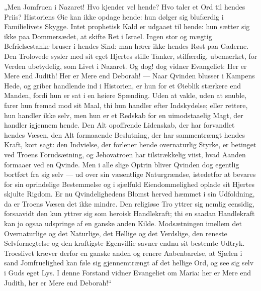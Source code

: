\documentclass[12pt,a4paper]{book}
\begin{document}
„Men Jomfruen i Nazaret! Hvo kjender vel hende? Hvo taler et Ord til hendes
Priis? Historiens Øie kan ikke opdage hende: hun dølger sig blufærdig i
Familielivets Skygge. Intet prophetisk Kald er udgaaet til hende: hun sætter sig
ikke paa Dommersædet, at skifte Ret i Israel. Ingen stor og mægtig
Befrielsestanke bruser i hendes Sind: man hører ikke hendes Røst paa Gaderne.
Den Trolovede sysler med sit eget Hjertes stille Tanker, stilfærdig, ubemærket,
for Verden ubetydelig, som Livet i Nazaret. Og dog! dog vidner Evangeliet: Her
er Mere end Judith! Her er Mere end Deborah! --- Naar Qvinden blusser i Kampens
Hede, og griber handlende ind i Historien, er hun for et Øieblik stærkere end
Manden, fordi hun er sat i en høiere Spænding. Uden at vakle, uden at snuble,
farer hun fremad mod sit Maal, thi hun handler efter Indskydelse; eller rettere,
hun handler ikke selv, men hun er et Redskab for en uimodstaaelig Magt, der
handler igjennem hende. Den Alt opoffrende Lidenskab, der har forvandlet hendes
Væsen, den Alt formaaende Beslutning, der har sammentrængt hendes Kraft, kort
sagt: den Indvielse, der forlener hende overnaturlig Styrke, er betinget ved
Troens Forudsætning, og Jehovatroen har tilstrækkelig viist, hvad Aanden formaaer
ved en Qvinde. Men i alle slige Optrin bliver Qvinden dog egentlig bortført fra
sig selv --- ud over sin væsentlige Naturgrændse, istedetfor at bevares for sin
oprindelige Bestemmelse og i sjælfuld Eiendommelighed oplade sit Hjertes skjulte
Rigdom. Er nu Qvindelighedens Blomst herved hæmmet i sin Udfoldning, da er
Troens Væsen det ikke mindre. Den religiøse Tro yttrer sig nemlig eensidig,
forsaavidt den kun yttrer sig som heroisk Handlekraft; thi en saadan
Handlekraft kan jo ogsaa udspringe af en ganske anden Kilde. Modsætningen
imellem det Overnaturlige og det Naturlige, det Hellige og det Verdslige, den
reneste Selvfornegtelse og den kraftigste Egenvillie savner endnu sit bestemte
Udtryk. Troeslivet kræver derfor en ganske anden og renere Aabenbarelse, at
Sjælen i sand Jomfruelighed kan føle sig gjennemtrængt af det hellige Ord, og
see sig selv i Guds eget Lys. I denne Forstand vidner Evangeliet om Maria: her
er Mere end Judith, her er Mere end Deborah!“
\end{document}
